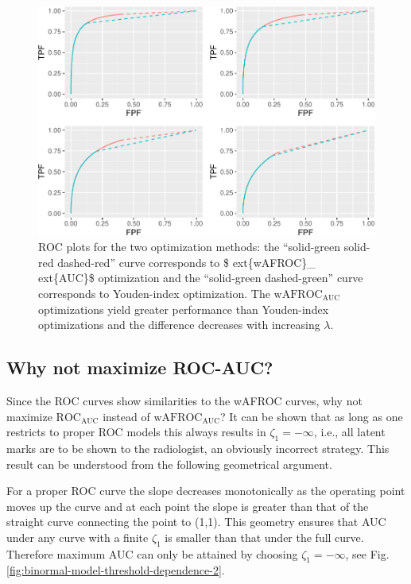\documentclass[
]{book}
\begin{document}
\begin{figure}
\centering
\includegraphics{21-optim-op-point_files/figure-latex/optim-op-point-vary-lambda-roc-1.pdf}
\caption{\label{fig:optim-op-point-vary-lambda-roc}ROC plots for the two optimization methods: the ``solid-green solid-red dashed-red'' curve corresponds to \$ ext\{wAFROC\}\_ ext\{AUC\}\$ optimization and the ``solid-green dashed-green'' curve corresponds to Youden-index optimization. The \(\text{wAFROC}_\text{AUC}\) optimizations yield greater performance than Youden-index optimizations and the difference decreases with increasing \(\lambda\).}
\end{figure}

\hypertarget{why-not-maximize-roc-auc}{%
\subsection{Why not maximize ROC-AUC?}\label{why-not-maximize-roc-auc}}

Since the ROC curves show similarities to the wAFROC curves, why not maximize \(\text{ROC}_\text{AUC}\) instead of \(\text{wAFROC}_\text{AUC}\)? It can be shown that as long as one restricts to proper ROC models this always results in \(\zeta_1 = -\infty\), i.e., all latent marks are to be shown to the radiologist, an obviously incorrect strategy. This result can be understood from the following geometrical argument.

For a proper ROC curve the slope decreases monotonically as the operating point moves up the curve and at each point the slope is greater than that of the straight curve connecting the point to (1,1). This geometry ensures that AUC under any curve with a finite \(\zeta_1\) is smaller than that under the full curve. Therefore maximum AUC can only be attained by choosing \(\zeta_1 = -\infty\), see Fig. \ref{fig:binormal-model-threshold-dependence-2}.
\end{document}
